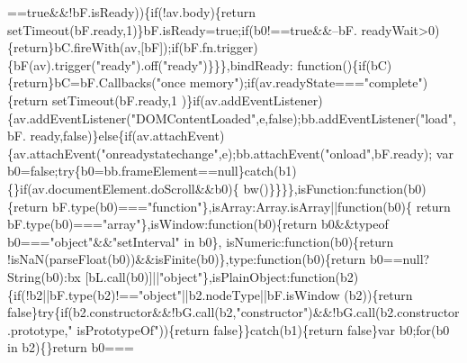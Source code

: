 \begin{DoxyCode}
      ==\textcolor{keyword}{true}&&!bF.isReady))\{\textcolor{keywordflow}{if}(!av.body)\{\textcolor{keywordflow}{return} setTimeout(bF.ready,1)\}bF.isReady=\textcolor{keyword}{true};\textcolor{keywordflow}{if}(b0!==\textcolor{keyword}{true}&&--bF.
      readyWait>0)\{\textcolor{keywordflow}{return}\}bC.fireWith(av,[bF]);\textcolor{keywordflow}{if}(bF.fn.trigger)\{bF(av).trigger(\textcolor{stringliteral}{"ready"}).off(\textcolor{stringliteral}{"ready"})\}\}\},bindReady:\textcolor{keyword}{
      function}()\{\textcolor{keywordflow}{if}(bC)\{\textcolor{keywordflow}{return}\}bC=bF.Callbacks(\textcolor{stringliteral}{"once memory"});\textcolor{keywordflow}{if}(av.readyState===\textcolor{stringliteral}{"complete"})\{\textcolor{keywordflow}{return} setTimeout(bF.ready,1
      )\}\textcolor{keywordflow}{if}(av.addEventListener)\{av.addEventListener(\textcolor{stringliteral}{"DOMContentLoaded"},e,\textcolor{keyword}{false});bb.addEventListener(\textcolor{stringliteral}{"load"},bF.
      ready,\textcolor{keyword}{false})\}\textcolor{keywordflow}{else}\{\textcolor{keywordflow}{if}(av.attachEvent)\{av.attachEvent(\textcolor{stringliteral}{"onreadystatechange"},e);bb.attachEvent(\textcolor{stringliteral}{"onload"},bF.ready);
      var b0=\textcolor{keyword}{false};\textcolor{keywordflow}{try}\{b0=bb.frameElement==null\}\textcolor{keywordflow}{catch}(b1)\{\}\textcolor{keywordflow}{if}(av.documentElement.doScroll&&b0)\{
      bw()\}\}\}\},isFunction:\textcolor{keyword}{function}(b0)\{\textcolor{keywordflow}{return} bF.type(b0)===\textcolor{stringliteral}{"function"}\},isArray:Array.isArray||\textcolor{keyword}{function}(b0)\{\textcolor{keywordflow}{
      return} bF.type(b0)===\textcolor{stringliteral}{"array"}\},isWindow:\textcolor{keyword}{function}(b0)\{\textcolor{keywordflow}{return} b0&&typeof b0===\textcolor{stringliteral}{"object"}&&\textcolor{stringliteral}{"setInterval"} in b0\},
      isNumeric:\textcolor{keyword}{function}(b0)\{\textcolor{keywordflow}{return} !isNaN(parseFloat(b0))&&isFinite(b0)\},type:\textcolor{keyword}{function}(b0)\{\textcolor{keywordflow}{return} b0==null?String(b0):bx
      [bL.call(b0)]||\textcolor{stringliteral}{"object"}\},isPlainObject:function(b2)\{\textcolor{keywordflow}{if}(!b2||bF.type(b2)!==\textcolor{stringliteral}{"object"}||b2.nodeType||bF.isWindow
      (b2))\{\textcolor{keywordflow}{return} \textcolor{keyword}{false}\}\textcolor{keywordflow}{try}\{\textcolor{keywordflow}{if}(b2.constructor&&!bG.call(b2,\textcolor{stringliteral}{"constructor"})&&!bG.call(b2.constructor.prototype,\textcolor{stringliteral}{"
      isPrototypeOf"}))\{\textcolor{keywordflow}{return} \textcolor{keyword}{false}\}\}\textcolor{keywordflow}{catch}(b1)\{\textcolor{keywordflow}{return} \textcolor{keyword}{false}\}var b0;\textcolor{keywordflow}{for}(b0 in b2)\{\}\textcolor{keywordflow}{return} b0===

\end{DoxyCode}
